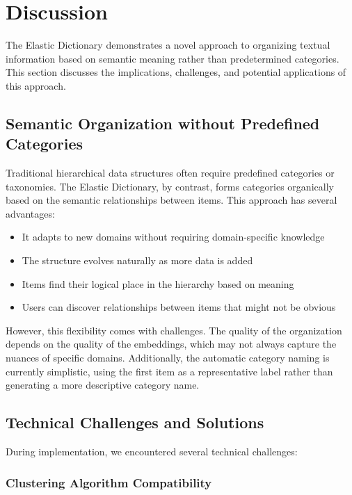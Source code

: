 \documentclass[conference]{IEEEtran}
\begin{document}
\section{Discussion}

The Elastic Dictionary demonstrates a novel approach to organizing textual information based on semantic meaning rather than predetermined categories. This section discusses the implications, challenges, and potential applications of this approach.

\subsection{Semantic Organization without Predefined Categories}

Traditional hierarchical data structures often require predefined categories or taxonomies. The Elastic Dictionary, by contrast, forms categories organically based on the semantic relationships between items. This approach has several advantages:

\begin{itemize}
    \item It adapts to new domains without requiring domain-specific knowledge
    \item The structure evolves naturally as more data is added
    \item Items find their logical place in the hierarchy based on meaning
    \item Users can discover relationships between items that might not be obvious
\end{itemize}

However, this flexibility comes with challenges. The quality of the organization depends on the quality of the embeddings, which may not always capture the nuances of specific domains. Additionally, the automatic category naming is currently simplistic, using the first item as a representative label rather than generating a more descriptive category name.

\subsection{Technical Challenges and Solutions}

During implementation, we encountered several technical challenges:

\subsubsection{Clustering Algorithm Compatibility}
\end{document}
